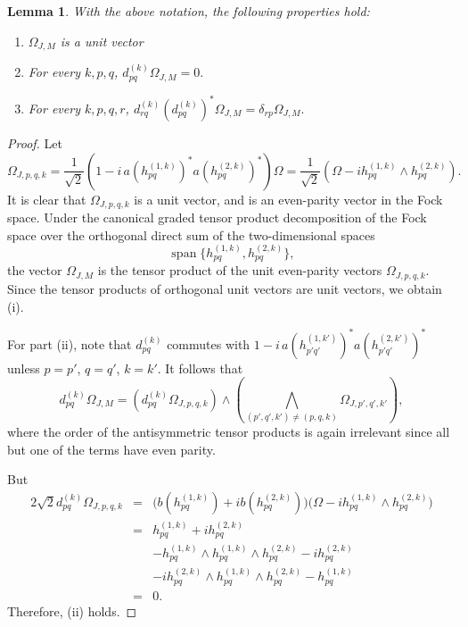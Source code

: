 \documentclass[11pt]{article}
\newtheorem{lemma}{Lemma}
\begin{document}
\begin{lemma} \label{lemma:propertiesOfOmega}
    With the above notation, the following properties hold: 
    \begin{enumerate}[label={\rm(\roman*)}]
    \item $\Omega_{J,M}$ is a unit vector 
    \item For every \(k,p,q\), \(
    d^{(k)}_{pq}\Omega_{J,M}=0. \) 
    \item For every \(k,p,q,r\), \(
    d^{(k)}_{rq}(d^{(k)}_{pq})^*\Omega_{J,M}
    =
    \delta_{rp}\Omega_{J,M}.
    \)
    \end{enumerate}
\end{lemma}
\begin{proof}
Let \[\Omega_{J, p,q,k}= \frac{1}{\sqrt{2}}\left(
      1-i\,a(h^{(1,k)}_{pq})^*a(h^{(2,k)}_{pq})^*
    \right)\Omega = \frac{1}{\sqrt{2}}\left(\Omega - i h^{(1,k)}_{pq}\wedge h^{(2,k)}_{pq}\right).\] It is clear that 
\(\Omega_{J, p,q,k}\) is a unit vector, and is an even-parity vector in the 
Fock space. 
Under the canonical graded tensor product decomposition of the Fock space
over the orthogonal direct sum of the two-dimensional spaces
\[
\operatorname{span}\{h_{pq}^{(1,k)},h_{pq}^{(2,k)}\},
\]
the vector \(\Omega_{J,M}\) is the tensor product of the unit even-parity vectors
\(\Omega_{J,p,q,k}\).  Since the tensor products of orthogonal unit vectors are unit vectors, we obtain (i).

For part (ii), note that $d^{(k)}_{pq}$ commutes with $1-i\,a(h^{(1,k')}_{p'q'})^*a(h^{(2,k')}_{p'q'})^*$ unless $p=p'$, $q=q'$, $k=k'$.  It follows that 
\[d^{(k)}_{pq}\Omega_{J,M} = \left(d^{(k)}_{pq} \Omega_{J,p,q,k}\right) 
\wedge \left(\bigwedge_{(p',q',k')\neq (p,q,k)} 
\Omega_{J,p',q',k'}\right), \] where the order of the antisymmetric tensor products is again irrelevant since all but one of the terms have even parity.

But
\begin{eqnarray*}
    2\sqrt{2} d^{(k)}_{pq} \Omega_{J,p,q,k} &=& 
    \bigl(b(h^{(1,k)}_{pq})+i b(h^{(2,k)}_{pq})\bigr) \bigl(\Omega - i h^{(1,k)}_{pq}\wedge h^{(2,k)}_{pq}\bigr) \\ &= & 
    h^{(1,k)}_{pq} + i h^{(2,k)}_{pq} \\
    && - h_{pq}^{(1,k)}\wedge h^{(1,k)}_{pq}\wedge h^{(2,k)}_{pq} - i h_{pq}^{(2,k)} \\
    &&  - i h_{pq}^{(2,k)} \wedge h^{(1,k)}_{pq}\wedge h^{(2,k)}_{pq}
     - h_{pq}^{(1,k)}  \\ &=& 0.
\end{eqnarray*} Therefore, (ii) holds. 


\end{proof}
\end{document}
